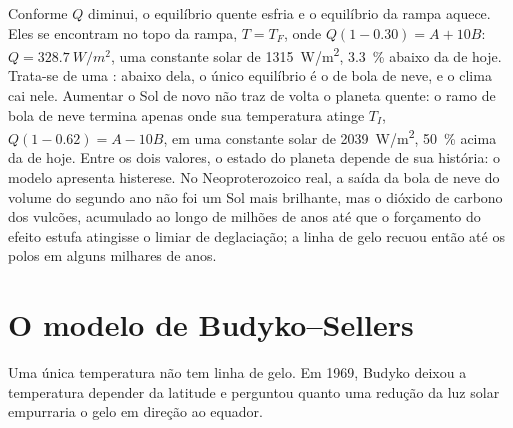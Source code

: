 \begin{omfigure}
\par{}\label{fig:b3:climate-models:zero-d}
\end{omfigure}

Conforme $Q$ diminui, o equilíbrio quente esfria e o equilíbrio da rampa aquece.
Eles se encontram no topo da rampa, $T = T_F$, onde $Q(1 - 0.30) = A +
10B$: $Q = \qty{328.7}{W/m^2}$, uma constante solar de \qty{1315}{W/m^2},
\qty{3.3}{\percent} abaixo da de hoje. Trata-se de uma : abaixo
dela, o único equilíbrio é o de bola de neve, e o clima cai nele.
Aumentar o Sol de novo não traz de volta o planeta quente: o ramo de bola de neve
termina apenas onde sua temperatura atinge $T_I$, $Q(1 - 0.62) = A -
10B$, em uma constante solar de \qty{2039}{W/m^2}, \qty{50}{\percent} acima da
de hoje. Entre os dois valores, o estado do planeta depende de sua história:
o modelo apresenta histerese. No Neoproterozoico real, a saída da bola de neve
do volume do segundo ano não foi um Sol mais brilhante, mas o dióxido de carbono
dos vulcões, acumulado ao longo de milhões de anos até que o forçamento do
efeito estufa atingisse o limiar de deglaciação; a linha de gelo recuou então até
os polos em alguns milhares de anos.

\section{O modelo de Budyko--Sellers}\label{sec:b3:climate-models:budyko-sellers}

Uma única temperatura não tem linha de gelo. Em 1969, Budyko deixou a temperatura
depender da latitude e perguntou quanto uma redução da luz solar empurraria o
gelo em direção ao equador.

